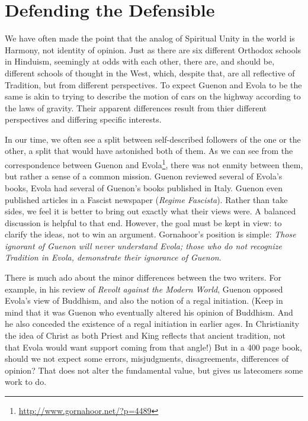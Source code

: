 \section{Defending the Defensible}

We have often made the point that the analog of Spiritual Unity in the world is Harmony, not identity of opinion. Just as there are six different Orthodox schools in Hinduism, seemingly at odds with each other, there are, and should be, different schools of thought in the West, which, despite that, are all reflective of Tradition, but from different perspectives. To expect Guenon and Evola to be the same is akin to trying to describe the motion of cars on the highway according to the laws of gravity. Their apparent differences result from thier different perspectives and differing specific interests.

In our time, we often see a split between self-described followers of the one or the other, a split that would have astonished both of them. As we can see from the correspondence between Guenon and Evola\footnote{\url{http://www.gornahoor.net/?p=4489}}, there was not enmity between them, but rather a sense of a common mission. Guenon reviewed several of Evola's books, Evola had several of Guenon's books published in Italy. Guenon even published articles in a Fascist newspaper (\emph{Regime Fascista}). Rather than take sides, we feel it is better to bring out exactly what their views were. A balanced discussion is helpful to that end. However, the goal must be kept in view: to clarify the ideas, not to win an argument. Gornahoor's position is simple: \emph{Those ignorant of Guenon will never understand Evola; those who do not recognize Tradition in Evola, demonstrate their ignorance of Guenon}.

There is much ado about the minor differences between the two writers. For example, in his review of \emph{Revolt against the Modern World}, Guenon opposed Evola's view of Buddhism, and also the notion of a regal initiation. (Keep in mind that it was Guenon who eventually altered his opinion of Buddhism. And he also conceded the existence of a regal initiation in earlier ages. In Christianity the idea of Christ as both Priest and King reflects that ancient tradition, not that Evola would want support coming from that angle!) But in a 400 page book, should we not expect some errors, misjudgments, disagreements, differences of opinion? That does not alter the fundamental value, but gives us latecomers some work to do.

